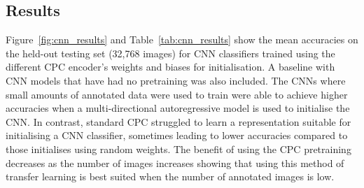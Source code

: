 \subsection{Results}
\label{subsec:unsupervised_results}
Figure~\ref{fig:cnn_results} and Table~\ref{tab:cnn_results} show the mean accuracies on the held-out testing set (32,768 images) for CNN classifiers trained using the different CPC encoder’s weights and biases for initialisation. A baseline with CNN models that have had no pretraining was also included. The CNNs where small amounts of annotated data were used to train were able to achieve higher accuracies when a multi-directional autoregressive model is used to initialise the CNN. In contrast, standard CPC struggled to learn a representation suitable for initialising a CNN classifier, sometimes leading to lower accuracies compared to those initialises using random weights. The benefit of using the CPC pretraining decreases as the number of images increases showing that using this method of transfer learning is best suited when the number of annotated images is low.

